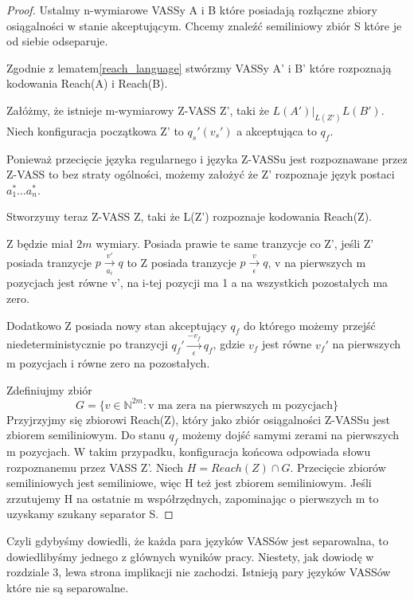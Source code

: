 \documentclass[magisterska]{pracamgr}
\newtheorem{proof}[theorem]{Dowód}
\begin{document}
    \begin{proof}
        Ustalmy n-wymiarowe VASSy A i B które posiadają rozłączne zbiory osiągalności w stanie akceptującym.
        Chcemy znaleźć semiliniowy zbiór S które je od siebie odseparuje.

        Zgodnie z lematem\ref{reach_language} stwórzmy VASSy A' i B' które rozpoznają kodowania Reach(A) i Reach(B).

        Załóżmy, że istnieje m-wymiarowy Z-VASS Z', taki że $L(A') |_{L(Z')} L(B')$.
        Niech konfiguracja początkowa Z' to $q_s '(v_s ')$ a akceptująca to $q_f$.

        Ponieważ przecięcie języka regularnego i języka Z-VASSu jest rozpoznawane przez Z-VASS to bez straty ogólności,
        możemy założyć że Z' rozpoznaje język postaci $a_1^* \dots a_n^*$.

        Stworzymy teraz Z-VASS Z, taki że L(Z') rozpoznaje kodowania Reach(Z).

        Z będzie miał $2m$ wymiary.
        Posiada prawie te same tranzycje co Z', jeśli Z' posiada tranzycje  $p \xrightarrow[a_i]{v'} q$ to Z posiada tranzycje
        $p \xrightarrow[\epsilon]{v} q$, v na pierwszych m pozycjach jest równe v', na i-tej pozycji ma 1 a na wszystkich pozostałych ma zero.

        Dodatkowo Z posiada nowy stan akceptujący $q_f$ do którego możemy przejść niedeterministycznie po tranzycji $q_f' \xrightarrow[\epsilon]{-v_f} q_f$,
        gdzie $v_f$ jest równe $v_f'$ na pierwszych m pozycjach i równe zero na pozostałych.

        Zdefiniujmy zbiór
        \[G=\{v \in \mathbb{N}^{2m} : \text{v ma zera na pierwszych m pozycjach} \}\]
        Przyjrzyjmy się zbiorowi Reach(Z), który jako zbiór osiągalności Z-VASSu jest zbiorem semiliniowym\cite{toolbox}.
        Do stanu $q_f$ możemy dojść samymi zerami na pierwszych m pozycjach.
        W takim przypadku, konfiguracja końcowa odpowiada słowu rozpoznanemu przez VASS Z'.
        Niech $H=Reach(Z) \cap G$.
        Przecięcie zbiorów semiliniowych jest semiliniowe, więc H też jest zbiorem semiliniowym.
        Jeśli zrzutujemy H na ostatnie m współrzędnych, zapominając o pierwszych m to uzyskamy szukany separator S.

    \end{proof}
    Czyli gdybyśmy dowiedli, że każda para języków VASSów jest separowalna, to dowiedlibyśmy jednego z głównych wyników pracy\cite{reach_sep_jerome}.
    Niestety, jak dowiodę w rozdziale 3, lewa strona implikacji nie zachodzi.
    Istnieją pary języków VASSów które nie są separowalne.
\end{document}
